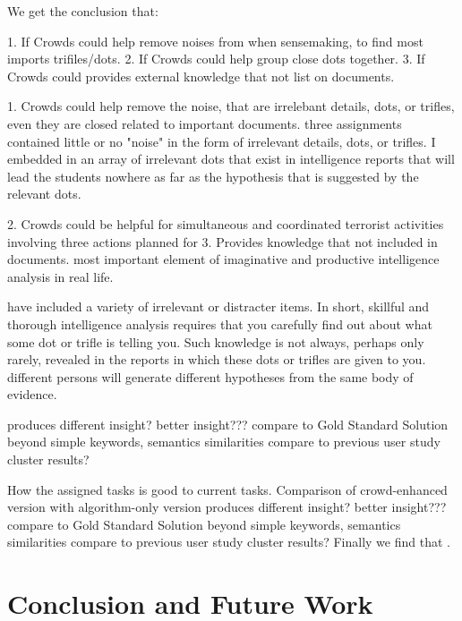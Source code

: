\documentclass[journal]{vgtc}                %
\begin{document}
We get the conclusion that:

1. If Crowds could help remove noises from when sensemaking, to find most imports trifiles/dots.
2. If Crowds could help group close dots together.
3. If Crowds could provides external knowledge that not list on documents.

1. Crowds could help remove the noise, that are irrelebant details, dots, or trifles, even they are closed related to important documents.
three assignments contained little or no "noise" in the form of irrelevant details, dots, or trifles. I
embedded in an array of irrelevant dots that exist in intelligence reports that will lead the students nowhere as far as the hypothesis that is suggested by the relevant dots.

2. Crowds could be helpful for simultaneous and coordinated terrorist activities involving three actions planned for
3. Provides knowledge that not included in documents. most important element of imaginative and productive intelligence analysis in real life.

have included a variety of irrelevant or distracter items.
In short, skillful and thorough intelligence analysis requires that you carefully find out about what some dot or trifle is telling you.
Such knowledge is not always, perhaps only rarely, revealed in the reports in which these dots or trifles are given to you.
different persons will generate different hypotheses from the same body of evidence.

produces different insight?
better insight???
compare to Gold Standard Solution
beyond simple keywords, semantics similarities
compare to previous user study cluster results?

How the assigned tasks is good to current tasks.
Comparison of crowd-enhanced version with algorithm-only version
produces different insight?
better insight???
compare to Gold Standard Solution
beyond simple keywords, semantics similarities
compare to previous user study cluster results?
Finally we find that .

\section{Conclusion and Future Work}
\end{document}
